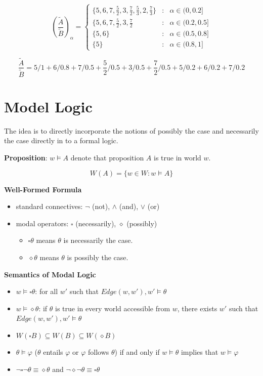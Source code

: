 \documentclass{article}
\begin{document}
$$(\frac{\tilde{A}}{\tilde{B}})_{\alpha} = \left\{\begin{matrix} \{5,6,7,\frac{5}{2},3,\frac{7}{2},\frac{5}{3},2,\frac{7}{3}\} & : & \alpha \in (0,0.2] \\  \{5,6,7,\frac{5}{2},3,\frac{7}{2} & : & \alpha \in (0.2,0.5] \\ \{5,6\} & : & \alpha \in (0.5,0.8] \\ \{5\} & : & \alpha \in (0.8,1] \end{matrix}\right.$$

$$\frac{\tilde{A}}{\tilde{B}} = 5/1 + 6/0.8 + 7/0.5 + \frac{5}{2}/0.5 + 3/0.5 + \frac{7}{2}/0.5 + 5/0.2 + 6/0.2 + 7/0.2$$



\section{Model Logic}

The idea is to directly incorporate the notions of possibly the case and necessarily the case directly in to a formal logic.

\textbf{Proposition}: $w \models A$ denote that proposition $A$ is true in world $w$.

\begin{equation}
    W(A) = \{ w \in W: w \models A \}
\end{equation}

\textbf{Well-Formed Formula}

\begin{itemize}
    \item standard connectives: $\neg$ (not), $\wedge$ (and), $\vee$ (or)
    \item modal operators: $\square$ (necessarily), $\diamond$ (possibly)
    \begin{itemize}
        \item $\square \theta$ means $\theta$ is necessarily the case.
        \item $\diamond \theta$ means $\theta$ is possibly the case.
    \end{itemize}
\end{itemize}


\textbf{Semantics of  Modal Logic}

\begin{itemize}
    \item $w \models \square \theta$: for all $w'$ such that $Edge(w, w'), w' \models \theta$
    \item $w \models \diamond \theta$: if $\theta$ is true in every world accessible from $w$, there exists $w'$ such that $Edge(w, w'), w' \models \theta$
    \item $W(\square B) \subseteq W(B) \subseteq W( \diamond B)$
    \item $\theta \models \varphi$ ($\theta$ entails $\varphi$ or $\varphi$ follows $\theta$) if and only if $w \models \theta$ implies that $w \models \varphi$
    \item $\neg \square \neg \theta \equiv \diamond \theta$ and $\neg \diamond \neg \theta \equiv \square \theta$
\end{itemize}
\end{document}
